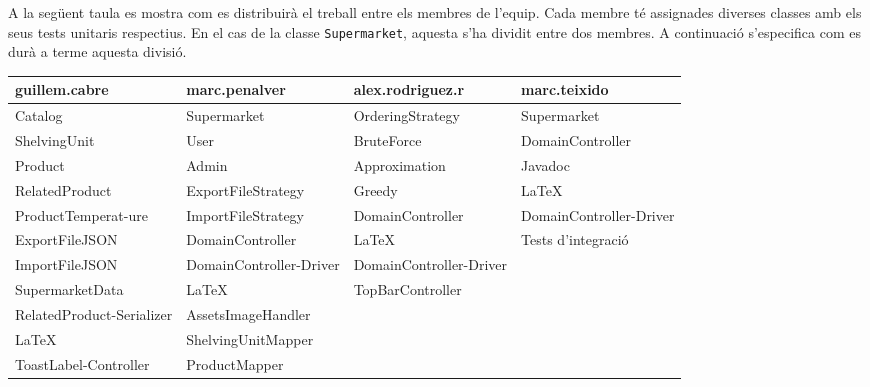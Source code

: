\documentclass[a4paper,12pt]{report}
\begin{document}
A la següent taula es mostra com es distribuirà el treball entre els membres de l’equip. Cada membre té assignades diverses classes amb els seus tests unitaris respectius. En el cas de la classe \texttt{Supermarket}, aquesta s’ha dividit entre dos membres. A continuació s’especifica com es durà a terme aquesta divisió.

\begin{table}[H]
	\centering
	\setlength{\arrayrulewidth}{0.5mm}
	\setlength{\tabcolsep}{5pt}
	\renewcommand{\arraystretch}{1.5}
	\centering
		\begin{tabularx}{\textwidth}{|X|X|X|X|} %
			\hline
			\rowcolor{gray!40} %
			guillem.cabre            & marc.penalver      & alex.rodriguez.r & marc.teixido    \\
			\hline
			Catalog                  & Supermarket        & OrderingStrategy & Supermarket     \\
			\hline
			ShelvingUnit             & User               & BruteForce       & DomainController\\
			\hline
			Product                  & Admin              & Approximation    & Javadoc         \\
			\hline
			RelatedProduct           & ExportFileStrategy & Greedy           & \LaTeX          \\
			\hline
			ProductTemperat-\newline ure       & ImportFileStrategy & DomainController & DomainController-\newline Driver \\
			\hline
			ExportFileJSON           & DomainController   & \LaTeX           & Tests d'integració \\
			\hline
			ImportFileJSON           & DomainController-\newline Driver & DomainController-\newline Driver & \\
			\hline
			SupermarketData          & \LaTeX & TopBarController &                 \\
			\hline
			RelatedProduct-\newline Serializer & AssetsImageHandler                   &                  &                 \\
			\hline
			\LaTeX & ShelvingUnitMapper &                  &                 \\
			\hline
			ToastLabel-\newline Controller & ProductMapper &                  &                 \\

\end{tabularx}
\end{table}
\end{document}
